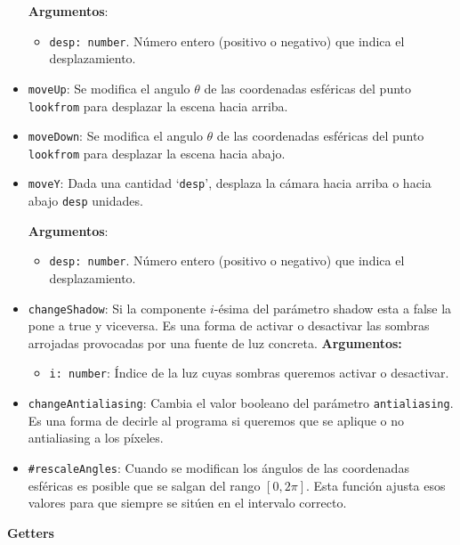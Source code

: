 \begin{itemize}
    \textbf{Argumentos}:
    \begin{itemize}
        \item \verb|desp: number|. Número entero (positivo o negativo) que indica el desplazamiento.
    \end{itemize}
    \item \verb|moveUp|: Se modifica el angulo $\theta$ de las coordenadas esféricas del punto \verb|lookfrom| para desplazar la escena hacia arriba.
    \item \verb|moveDown|: Se modifica el angulo $\theta$ de las coordenadas esféricas del punto \verb|lookfrom| para desplazar la escena hacia abajo.
    \item \verb|moveY|: Dada una cantidad `\verb|desp|', desplaza la cámara hacia arriba o hacia abajo \verb|desp| unidades.

    \textbf{Argumentos}:
    \begin{itemize}
        \item \verb|desp: number|. Número entero (positivo o negativo) que indica el desplazamiento.
    \end{itemize}
    \item \verb|changeShadow|: Si la componente $i$-ésima del parámetro shadow esta a false la pone a true y viceversa. Es una forma de activar o desactivar las sombras arrojadas provocadas por una fuente de luz concreta.
    \textbf{Argumentos:}
    \begin{itemize}
        \item \verb|i: number|: Índice de la luz cuyas sombras queremos activar o desactivar.
    \end{itemize}
    \item \verb|changeAntialiasing|: Cambia el valor booleano del parámetro \verb|antialiasing|. Es una forma de decirle al programa si queremos que se aplique o no antialiasing a los píxeles.
    \item \verb|#rescaleAngles|: Cuando se modifican los ángulos de las coordenadas esféricas es posible que se salgan del rango $[0, 2\pi]$. Esta función ajusta esos valores para que siempre se sitúen en el intervalo correcto.
\end{itemize}
\textbf{Getters}
